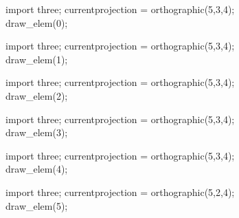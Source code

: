 \documentclass[../gatm_answers.tex]{subfiles}
\begin{document}
\begin{figure}[h]
	\begin{center}
		\begin{minipage}[b]{0.3\textwidth}
			\centering
			\begin{asy}[width=0.8\textwidth]
				import three;
				currentprojection = orthographic(5,3,4);
				draw_elem(0);
			\end{asy}
		\end{minipage}
		\hfill
		\begin{minipage}[b]{0.3\textwidth}
			\centering
			\begin{asy}[width=0.8\textwidth]
				import three;
				currentprojection = orthographic(5,3,4);
				draw_elem(1);
			\end{asy}
		\end{minipage}
		\hfill
		\begin{minipage}[b]{0.3\textwidth}
			\centering
			\begin{asy}[width=0.8\textwidth]
				import three;
				currentprojection = orthographic(5,3,4);
				draw_elem(2);
			\end{asy}
		\end{minipage}
	\end{center}

	\begin{center}
		\begin{minipage}[b]{0.3\textwidth}
			\centering
			\begin{asy}[width=0.8\textwidth]
				import three;
				currentprojection = orthographic(5,3,4);
				draw_elem(3);
			\end{asy}
		\end{minipage}
		\hfill
		\begin{minipage}[b]{0.3\textwidth}
			\centering
			\begin{asy}[width=0.8\textwidth]
				import three;
				currentprojection = orthographic(5,3,4);
				draw_elem(4);
			\end{asy}
		\end{minipage}
		\hfill
		\begin{minipage}[b]{0.3\textwidth}
			\centering
			\begin{asy}[width=0.9\textwidth]
				import three;
				currentprojection = orthographic(5,2,4);
				draw_elem(5);
			\end{asy}
		\end{minipage}
	\end{center}
\end{figure}
\end{document}
